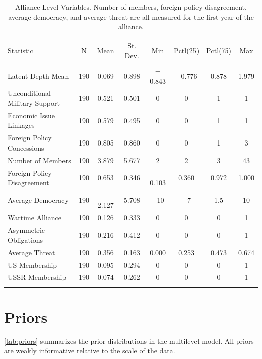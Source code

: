 \documentclass[12pt]{article}
\begin{document}
\begin{table}[!htbp] \centering 
  \caption{Alliance-Level Variables. Number of members, foreign policy disagreement, average democracy, and average threat are all measured for the first year of the alliance.} 
  \label{tab:all-level-sum} 
\begin{tabular}{@{\extracolsep{5pt}}lccccccc} 
\\[-1.8ex]\hline 
\hline \\[-1.8ex] 
Statistic & \multicolumn{1}{c}{N} & \multicolumn{1}{c}{Mean} & \multicolumn{1}{c}{St. Dev.} & \multicolumn{1}{c}{Min} & \multicolumn{1}{c}{Pctl(25)} & \multicolumn{1}{c}{Pctl(75)} & \multicolumn{1}{c}{Max} \\ 
\hline \\[-1.8ex] 
Latent Depth Mean & 190 & 0.069 & 0.898 & $-$0.843 & $-$0.776 & 0.878 & 1.979 \\ 
Unconditional Military Support & 190 & 0.521 & 0.501 & 0 & 0 & 1 & 1 \\ 
Economic Issue Linkages & 190 & 0.579 & 0.495 & 0 & 0 & 1 & 1 \\ 
Foreign Policy Concessions & 190 & 0.805 & 0.860 & 0 & 0 & 1 & 3 \\ 
Number of Members& 190 & 3.879 & 5.677 & 2 & 2 & 3 & 43 \\ 
Foreign Policy Disagreement & 190 & 0.653 & 0.346 & $-$0.103 & 0.360 & 0.972 & 1.000 \\ 
Average Democracy & 190 & $-$2.127 & 5.708 & $-$10 & $-$7 & 1.5 & 10 \\ 
Wartime Alliance & 190 & 0.126 & 0.333 & 0 & 0 & 0 & 1 \\ 
Asymmetric Obligations & 190 & 0.216 & 0.412 & 0 & 0 & 0 & 1 \\ 
Average Threat & 190 & 0.356 & 0.163 & 0.000 & 0.253 & 0.473 & 0.674 \\ 
US Membership & 190 & 0.095 & 0.294 & 0 & 0 & 0 & 1 \\ 
USSR Membership & 190 & 0.074 & 0.262 & 0 & 0 & 0 & 1 \\ 
\hline \\[-1.8ex] 
\end{tabular} 
\end{table} 



\section{Priors}

\autoref{tab:priors} summarizes the prior distributions in the multilevel model. 
All priors are weakly informative relative to the scale of the data. 
\end{document}
